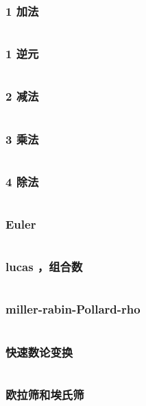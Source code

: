 \documentclass{article}
\begin{document}
\subsubsection{1 加法}
\inputminted{c++}{/home/zzuzxy/t2/Template1.0/4 数学/数论/1 加法.cpp}
\subsubsection{1 逆元}
\inputminted{c++}{/home/zzuzxy/t2/Template1.0/4 数学/数论/1 逆元.cpp}
\subsubsection{2 减法}
\inputminted{c++}{/home/zzuzxy/t2/Template1.0/4 数学/数论/2 减法.cpp}
\subsubsection{3 乘法}
\inputminted{c++}{/home/zzuzxy/t2/Template1.0/4 数学/数论/3 乘法.cpp}
\subsubsection{4 除法}
\inputminted{c++}{/home/zzuzxy/t2/Template1.0/4 数学/数论/4 除法.cpp}
\subsubsection{Euler}
\inputminted{c++}{/home/zzuzxy/t2/Template1.0/4 数学/数论/Euler.cpp}
\subsubsection{lucas ，组合数}
\inputminted{c++}{/home/zzuzxy/t2/Template1.0/4 数学/数论/lucas ，组合数.cpp}
\subsubsection{miller-rabin-Pollard-rho}
\inputminted{c++}{/home/zzuzxy/t2/Template1.0/4 数学/数论/miller-rabin-Pollard-rho.cpp}
\subsubsection{快速数论变换}
\inputminted{c++}{/home/zzuzxy/t2/Template1.0/4 数学/数论/快速数论变换.cpp}
\subsubsection{欧拉筛和埃氏筛}
\inputminted{c++}{/home/zzuzxy/t2/Template1.0/4 数学/数论/欧拉筛和埃氏筛.cpp}
\end{document}
